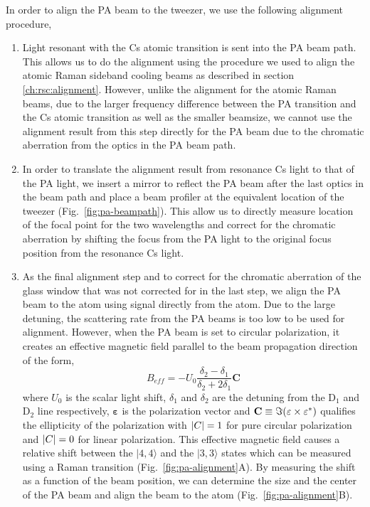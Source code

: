 In order to align the PA beam to the tweezer, we use the following alignment procedure,
\begin{enumerate}
\item Light resonant with the Cs atomic transition is sent into the PA beam path.
  This allows us to do the alignment using the procedure we used to align the
  atomic Raman sideband cooling beams as described in section \ref{ch:rsc:alignment}.
  However, unlike the alignment for the atomic Raman beams,
  due to the larger frequency difference between the PA transition and the Cs atomic
  transition as well as the smaller beamsize,
  we cannot use the alignment result from this step directly for the PA beam
  due to the chromatic aberration from the optics in the PA beam path.
\item In order to translate the alignment result from resonance Cs light to that of the PA light,
  we insert a mirror to reflect the PA beam after the last optics in the beam path
  and place a beam profiler at the equivalent location of the tweezer
  (Fig.~\ref{fig:pa-beampath}).
  This allow us to directly measure location of the focal point for the two wavelengths
  and correct for the chromatic aberration by shifting the focus from the PA light
  to the original focus position from the resonance Cs light.
\item As the final alignment step and to correct for the chromatic aberration of the
  glass window that was not corrected for in the last step,
  we align the PA beam to the atom using signal directly from the atom.
  Due to the large detuning, the scattering rate from the PA beams
  is too low to be used for alignment.
  However, when the PA beam is set to circular polarization, it creates an effective
  magnetic field parallel to the beam propagation direction
  of the form\cite{thompson_coherence_2013},
  \[ B_{eff}=-U_0\frac{\delta_2-\delta_1}{\delta_2+2\delta_1}\mathbf{C} \]
  where $U_0$ is the scalar light shift, $\delta_1$ and $\delta_2$ are the detuning from the
  $\mathrm{D}_1$ and $\mathrm{D}_2$ line respectively,
  $\mathbf{\varepsilon}$ is the polarization vector and
  $\mathbf{C}\equiv\Im{\left({\mathbf{\varepsilon}\times\mathbf{\varepsilon}^*}\right)}$
  qualifies the ellipticity of the polarization with
  ${\left|{C}\right|}=1$ for pure circular polarization and ${\left|{C}\right|}=0$ for linear polarization.
  This effective magnetic field causes a relative shift between the $|4,4\rangle$
  and the $|3,3\rangle$ states which can be measured using a Raman transition
  (Fig.~\ref{fig:pa-alignment}A).
  By measuring the shift as a function of the beam position,
  we can determine the size and the center of the PA beam and align the beam to the atom
  (Fig.~\ref{fig:pa-alignment}B).
\end{enumerate}

